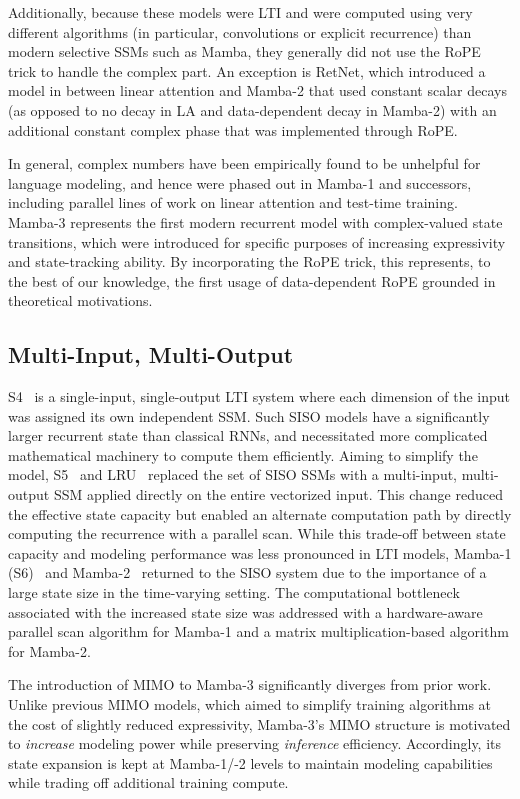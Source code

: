 Additionally, because these models were LTI and were computed using very different algorithms (in particular, convolutions or explicit recurrence) than modern selective SSMs such as Mamba, they generally did not use the RoPE trick to handle the complex part.
An exception is RetNet, which introduced a model in between linear attention and Mamba-2 that used constant scalar decays (as opposed to no decay in LA and data-dependent decay in Mamba-2) with an additional constant complex phase that was implemented through RoPE.

In general, complex numbers have been empirically found to be unhelpful for language modeling, and hence were phased out in Mamba-1 and successors, including parallel lines of work on linear attention and test-time training.
Mamba-3 represents the first modern recurrent model with complex-valued state transitions,
which were introduced for specific purposes of increasing expressivity and state-tracking ability.
By incorporating the RoPE trick, this represents, to the best of our knowledge, the first usage of data-dependent RoPE grounded in theoretical motivations.

\subsection{Multi-Input, Multi-Output} 
S4~\citep{S4} is a single-input, single-output LTI system where each dimension of the input was assigned its own independent SSM.
Such SISO models have a significantly larger recurrent state than classical RNNs, and necessitated more complicated mathematical machinery to compute them efficiently.
Aiming to simplify the model, S5~\citep{S5} and LRU~\citep{LRU} replaced the set of SISO SSMs with a multi-input, multi-output SSM applied directly on the entire vectorized input.
This change reduced the effective state capacity but enabled an alternate computation path by directly computing the recurrence with a parallel scan.
While this trade-off between state capacity and modeling performance was less pronounced in LTI models, Mamba-1 (S6)~\citep{gu2024mambalineartimesequencemodeling} and Mamba-2~\citep{dao2024transformersssmsgeneralizedmodels} returned to the SISO system due to the importance of a large state size in the time-varying setting.
The computational bottleneck associated with the increased state size was addressed with a hardware-aware parallel scan algorithm for Mamba-1 and a matrix multiplication-based algorithm for Mamba-2.

The introduction of MIMO to Mamba-3 significantly diverges from prior work. Unlike previous MIMO models, which aimed to simplify training algorithms at the cost of slightly reduced expressivity,
Mamba-3's MIMO structure is motivated to \emph{increase} modeling power while preserving \emph{inference} efficiency.
Accordingly, its state expansion is kept at Mamba-1/-2 levels to maintain modeling capabilities while trading off additional training compute.


